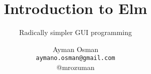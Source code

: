 \documentclass{beamer}
\title{Introduction to Elm}
\subtitle{Radically simpler GUI programming}
\author[Ayman Osman]{
  Ayman Osman
  \\ \texttt{aymano.osman@gmail.com}
  \\ @mrozuman
}
\begin{document}
\begin{frame}
  \titlepage
\end{frame}




\end{document}

